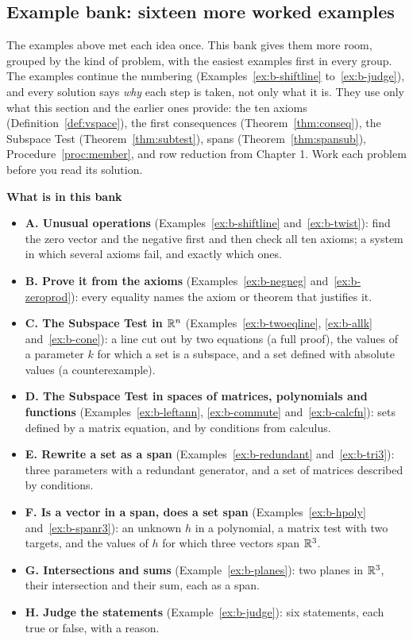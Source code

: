 \documentclass[11pt]{article}
\begin{document}
\subsection*{Example bank: sixteen more worked examples}

The examples above met each idea once. This bank gives them more room, grouped by the kind of problem, with the easiest examples first in every group. The examples continue the numbering (Examples~\ref{ex:b-shiftline} to~\ref{ex:b-judge}), and every solution says \emph{why} each step is taken, not only what it is. They use only what this section and the earlier ones provide: the ten axioms (Definition~\ref{def:vspace}), the first consequences (Theorem~\ref{thm:conseq}), the Subspace Test (Theorem~\ref{thm:subtest}), spans (Theorem~\ref{thm:spansub}), Procedure~\ref{proc:member}, and row reduction from Chapter 1. Work each problem before you read its solution.

\textbf{What is in this bank}
\begin{itemize}
  \item \textbf{A. Unusual operations} (Examples~\ref{ex:b-shiftline} and~\ref{ex:b-twist}): find the zero vector and the negative first and then check all ten axioms; a system in which several axioms fail, and exactly which ones.
  \item \textbf{B. Prove it from the axioms} (Examples~\ref{ex:b-negneg} and~\ref{ex:b-zeroprod}): every equality names the axiom or theorem that justifies it.
  \item \textbf{C. The Subspace Test in $\mathbb{R}^n$} (Examples~\ref{ex:b-twoeqline}, \ref{ex:b-allk} and~\ref{ex:b-cone}): a line cut out by two equations (a full proof), the values of a parameter $k$ for which a set is a subspace, and a set defined with absolute values (a counterexample).
  \item \textbf{D. The Subspace Test in spaces of matrices, polynomials and functions} (Examples~\ref{ex:b-leftann}, \ref{ex:b-commute} and~\ref{ex:b-calcfn}): sets defined by a matrix equation, and by conditions from calculus.
  \item \textbf{E. Rewrite a set as a span} (Examples~\ref{ex:b-redundant} and~\ref{ex:b-tri3}): three parameters with a redundant generator, and a set of matrices described by conditions.
  \item \textbf{F. Is a vector in a span, does a set span} (Examples~\ref{ex:b-hpoly} and~\ref{ex:b-spanr3}): an unknown $h$ in a polynomial, a matrix test with two targets, and the values of $h$ for which three vectors span $\mathbb{R}^3$.
  \item \textbf{G. Intersections and sums} (Example~\ref{ex:b-planes}): two planes in $\mathbb{R}^3$, their intersection and their sum, each as a span.
  \item \textbf{H. Judge the statements} (Example~\ref{ex:b-judge}): six statements, each true or false, with a reason.
\end{itemize}
\end{document}
